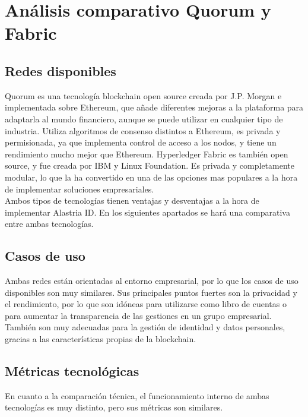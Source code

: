 \chapter{Análisis comparativo Quorum y Fabric}
\section{Redes disponibles}
Quorum es una tecnología blockchain open source creada por J.P. Morgan e implementada sobre Ethereum, que añade diferentes mejoras a la plataforma para adaptarla al mundo financiero, aunque se puede utilizar en cualquier tipo de industria. Utiliza algoritmos de consenso distintos a Ethereum, es privada y permisionada, ya que implementa control de acceso a los nodos, y tiene un rendimiento mucho mejor que Ethereum.
Hyperledger Fabric es también open source, y fue creada por IBM y Linux Foundation. Es privada y completamente modular, lo que la ha convertido en una de las opciones mas populares a la hora de implementar soluciones empresariales.\\
Ambos tipos de tecnologías tienen ventajas y desventajas a la hora de implementar Alastria ID. En los siguientes apartados se hará una comparativa entre ambas tecnologías.
\section{Casos de uso}
Ambas redes están orientadas al entorno empresarial, por lo que los casos de uso disponibles son muy similares. Sus principales puntos fuertes son la privacidad y el rendimiento, por lo que son idóneas para utilizarse como libro de cuentas o para aumentar la transparencia de las gestiones en un grupo empresarial. También son muy adecuadas para la gestión de identidad y datos personales, gracias a las características propias de la blockchain.
\clearpage
\section{Métricas tecnológicas}
En cuanto a la comparación técnica, el funcionamiento interno de ambas tecnologías es muy distinto, pero sus métricas son similares.
